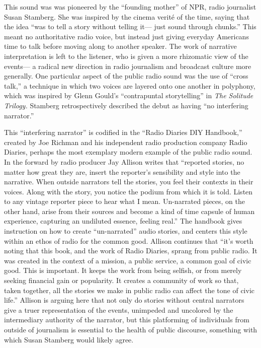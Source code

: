 \documentclass[12pt,letterpaper]{article}
\begin{document}
	This sound was was pioneered by the ``founding mother'' of NPR, radio 
	journalist Susan Stamberg. She was inspired by the cinema verité of the
	time, saying that the idea ``was to tell a story without telling it---
	just sound through chunks.'' This meant no authoritative radio voice,
	but instead just giving everyday Americans time to talk before moving 
	along to another speaker. The work of narrative interpretation is left
	to the listener, who is given a more rhizomatic view of the events---
	a radical new direction in radio journalism and broadcast culture more
	generally.  One particular aspect of the public radio sound was the use
	of ``cross
	talk,'' a technique in which two voices are layered onto one another 	
	in polyphony, which was inspired by Glenn Gould's ``contrapuntal 
	storytelling'' in \textit{The Solitude Trilogy.}\autocite[197]{Porter}
	Stamberg retrospectively described the debut as having ``no interfering 
	narrator.''\autocite[185]{Porter}

	This ``interfering narrator'' is codified in the ``Radio Diaries DIY
	Handbook,'' created by Joe Richman and his independent radio production
	company Radio Diaries, perhaps the most exemplary modern example of the 	public radio sound. In the forward by radio producer Jay Allison writes 	that ``reported stories, no matter how great they are, 
	insert the reporter’s sensibility and style into the narrative. When 
	outside narrators tell the stories, you feel their contexts in their 
	voices. Along with the story, you notice the podium from which it is 
	told. Listen to any vintage reporter piece to hear what I mean. 
	Un-narrated pieces, on the other hand, arise from their sources and 
	become a kind of time capsule of human experience, capturing an 
	undiluted essence, feeling real.'' The handbook gives instruction on how
	to create ``un-narrated'' audio stories, and centers this style within
	an ethos of radio for the common good. Allison continues that ``it's 
	worth noting that this book, and the work of 
	Radio Diaries, sprang from public radio. It was created in the context 
	of a mission, a public service, a common goal of civic good. This is 
	important. It keeps the work from being selfish, or from merely seeking
	financial gain or popularity. It creates a community of work so that, 
	taken together, all the stories we make in public radio can affect the 
	tone of civic life.''\autocite{Richman} Allison is arguing here that not only
	do stories without central narrators give a truer representation of the 
	events, unimpeded and uncolored by the intermediary authority of the
	narrator, but this platforming of individuals from outside of journalism
	is essential to the health of public discourse, something with which
	Susan Stamberg would likely agree.  
	
\end{document}

